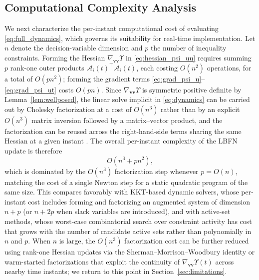 \documentclass[fleqn,10pt]{wlscirep}
\begin{document}
\subsection{Computational Complexity Analysis}
We next characterize the per-instant computational cost of evaluating \eqref{eq:full_dynamics}, which governs its suitability for real-time implementation. Let $n$ denote the decision-variable dimension and $p$ the number of inequality constraints. Forming the Hessian $\nabla_{\bm{vv}}\Upsilon$ in \eqref{eq:hessian_psi_uu} requires summing $p$ rank-one outer products $\mathcal{A}_i(t)^\top\mathcal{A}_i(t)$, each costing $O(n^2)$ operations, for a total of $O(pn^2)$; forming the gradient terms \eqref{eq:grad_psi_u}--\eqref{eq:grad_psi_ut} costs $O(pn)$. Since $\nabla_{\bm{vv}}\Upsilon$ is symmetric positive definite by Lemma~\ref{lem:wellposed}, the linear solve implicit in \eqref{eq:dynamics} can be carried out by Cholesky factorization at a cost of $O(n^3)$ rather than by an explicit $O(n^3)$ matrix inversion followed by a matrix--vector product, and the factorization can be reused across the right-hand-side terms sharing the same Hessian at a given instant \cite{book12}. The overall per-instant complexity of the LBFN update is therefore
\begin{equation}
O(n^3 + pn^2),
\label{eq:complexity}
\end{equation}
which is dominated by the $O(n^3)$ factorization step whenever $p=O(n)$, matching the cost of a single Newton step for a static quadratic program of the same size. This compares favorably with KKT-based dynamic solvers, whose per-instant cost includes forming and factorizing an augmented system of dimension $n+p$ (or $n+2p$ when slack variables are introduced), and with active-set methods, whose worst-case combinatorial search over constraint activity has cost that grows with the number of candidate active sets rather than polynomially in $n$ and $p$. When $n$ is large, the $O(n^3)$ factorization cost can be further reduced using rank-one Hessian updates via the Sherman--Morrison--Woodbury identity or warm-started factorizations that exploit the continuity of $\nabla_{\bm{vv}}\Upsilon(t)$ across nearby time instants; we return to this point in Section~\ref{sec:limitations}.
\end{document}

